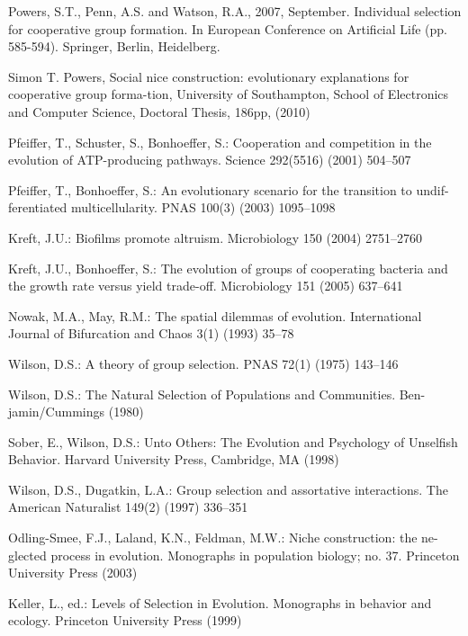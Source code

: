 \documentclass[runningheads]{llncs}
\begin{document}
%
%
%
% 
% 
%
\begin{thebibliography}{8}

Powers, S.T., Penn, A.S. and Watson, R.A., 2007, September. Individual
selection for cooperative group formation. In European Conference on
Artificial Life (pp. 585-594). Springer, Berlin, Heidelberg.

Simon T. Powers, Social nice construction: evolutionary explanations for cooperative group forma-tion, University of Southampton, School of Electronics and Computer Science, Doctoral Thesis, 186pp, (2010)
  
Pfeiffer, T., Schuster, S., Bonhoeffer, S.: Cooperation and competition in the evolution of ATP-producing pathways. Science 292(5516) (2001) 504–507 

Pfeiffer, T., Bonhoeffer, S.: An evolutionary scenario for the
transition to undif-ferentiated multicellularity. PNAS 100(3) (2003)
1095–1098

Kreft, J.U.: Biofilms promote altruism. Microbiology 150 (2004)
2751–2760

Kreft, J.U., Bonhoeffer, S.: The evolution of groups of cooperating
bacteria and the growth rate versus yield trade-off. Microbiology 151
(2005) 637–641

Nowak, M.A., May, R.M.: The spatial dilemmas of
evolution. International Journal of Bifurcation and Chaos 3(1) (1993)
35–78

Wilson, D.S.: A theory of group selection. PNAS 72(1) (1975) 143–146 

Wilson, D.S.: The Natural Selection of Populations and Communities. Ben-jamin/Cummings (1980) 

Sober, E., Wilson, D.S.: Unto Others: The Evolution and Psychology of Unselfish Behavior. Harvard University Press, Cambridge, MA (1998) 

Wilson, D.S., Dugatkin, L.A.: Group selection and assortative
interactions. The American Naturalist 149(2) (1997) 336–351

Odling-Smee, F.J., Laland, K.N., Feldman, M.W.: Niche construction:
the ne-glected process in evolution. Monographs in population biology;
no. 37. Princeton University Press (2003)

Keller, L., ed.: Levels of Selection in Evolution. Monographs in behavior and ecology. Princeton University Press (1999)

\end{thebibliography}
\end{document}
